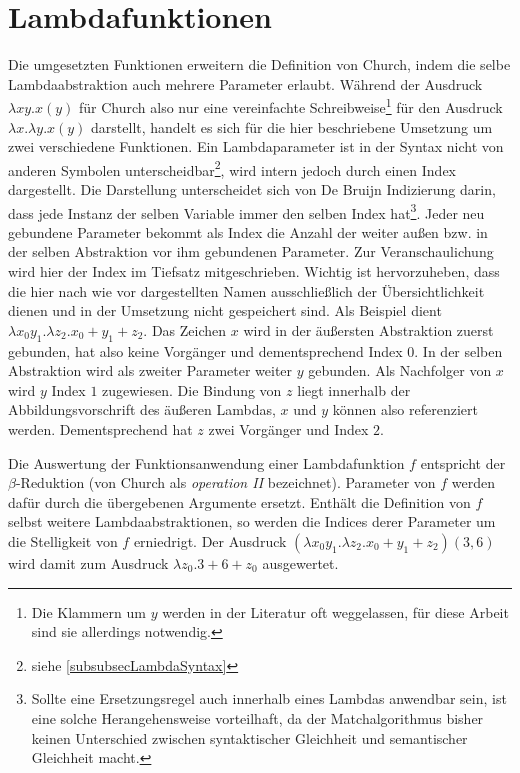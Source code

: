 \section{Lambdafunktionen} \label{subsecLambdafunktionen}
Die umgesetzten Funktionen erweitern die Definition von Church, indem die selbe Lambdaabstraktion auch mehrere Parameter erlaubt. Während der Ausdruck $\lambda x y . x(y)$ für Church also nur eine vereinfachte Schreibweise\footnote{Die Klammern um $y$ werden in der Literatur oft weggelassen, für diese Arbeit sind sie allerdings notwendig.} für den Ausdruck $\lambda x .\lambda y .x(y)$ darstellt, handelt es sich für die hier beschriebene Umsetzung um zwei verschiedene Funktionen. 
Ein Lambdaparameter ist in der Syntax nicht von anderen Symbolen unterscheidbar\footnote{siehe \ref{subsubsecLambdaSyntax}}, wird intern jedoch durch einen Index dargestellt. Die Darstellung unterscheidet sich von De Bruijn Indizierung \cite{deBruijn} darin, dass jede Instanz der selben Variable immer den selben Index hat\footnote{Sollte eine Ersetzungsregel auch innerhalb eines Lambdas anwendbar sein, ist eine solche Herangehensweise vorteilhaft, da der Matchalgorithmus bisher keinen Unterschied zwischen syntaktischer Gleichheit und semantischer Gleichheit macht.}.
 Jeder neu gebundene Parameter bekommt als Index die Anzahl der weiter außen bzw. in der selben Abstraktion vor ihm gebundenen Parameter. Zur Veranschaulichung wird hier der Index im Tiefsatz mitgeschrieben. Wichtig ist hervorzuheben, dass die hier nach wie vor dargestellten Namen ausschließlich der Übersichtlichkeit dienen und in der Umsetzung nicht gespeichert sind.
 Als Beispiel dient $\lambda x_0 y_1 .\lambda z_2 .x_0 + y_1 + z_2$. Das Zeichen $x$ wird in der äußersten Abstraktion zuerst gebunden, hat also keine Vorgänger und dementsprechend Index $0$. In der selben Abstraktion wird als zweiter Parameter weiter $y$ gebunden. Als Nachfolger von $x$ wird $y$ Index $1$ zugewiesen. Die Bindung von $z$ liegt innerhalb der Abbildungsvorschrift des äußeren Lambdas, $x$ und $y$ können also referenziert werden. Dementsprechend hat $z$ zwei Vorgänger und Index $2$. 
 
 Die Auswertung der Funktionsanwendung einer Lambdafunktion $f$ entspricht der $\beta$-Reduktion (von Church \cite{ChurchLambda36} als \textit{operation II} bezeichnet). Parameter von $f$ werden dafür durch die übergebenen Argumente ersetzt. Enthält die Definition von $f$ selbst weitere Lambdaabstraktionen, so werden die Indices derer Parameter um die Stelligkeit von $f$ erniedrigt.
 Der Ausdruck $(\lambda x_0 y_1 .\lambda z_2 .x_0 + y_1 + z_2)(3, 6)$ wird damit zum Ausdruck $\lambda z_0 .3 + 6 + z_0$ ausgewertet.
 
